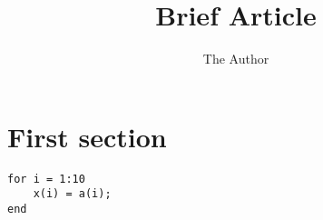 \documentclass[11pt]{article} %
\title{Brief Article}
\author{The Author}
\begin{document}
\maketitle

\section{First section}


\begin{verbatim}
for i = 1:10
	x(i) = a(i);
end
\end{verbatim}

\end{document}

